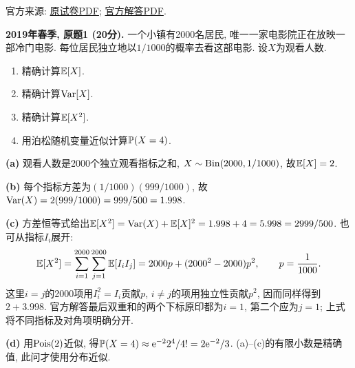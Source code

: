 \noindent 官方来源: \href{https://ocw.mit.edu/courses/18-600-probability-and-random-variables-fall-2019/1ef24cd4a1d900eabbc7e354063beebe_MIT18_600F19_mid1_2019.pdf}{原试卷PDF}; \href{https://ocw.mit.edu/courses/18-600-probability-and-random-variables-fall-2019/043a5f241c41a11ebbae7a84acfa94d2_MIT18_600F19_mid1_2019_soln.pdf}{官方解答PDF}.
\begin{exercise}\label{ex:m1-2019s-q1}
\textbf{2019年春季, 原题1 (20分).} 一个小镇有2000名居民, 唯一一家电影院正在放映一部冷门电影. 每位居民独立地以$1/1000$的概率去看这部电影. 设$X$为观看人数.
\begin{enumerate}\item[(a)]\label{ex:m1-2019s-q1-a} 精确计算$\mathbb E[X]$.\item[(b)]\label{ex:m1-2019s-q1-b} 精确计算$\operatorname{Var}[X]$.\item[(c)]\label{ex:m1-2019s-q1-c} 精确计算$\mathbb E[X^2]$.\item[(d)]\label{ex:m1-2019s-q1-d} 用泊松随机变量近似计算$\mathbb P(X=4)$.\end{enumerate}
\end{exercise}
\begin{solution}
\textbf{(a)}\label{sol:m1-2019s-q1-a} 观看人数是2000个独立观看指标之和, $X\sim\operatorname{Bin}(2000,1/1000)$, 故$\mathbb E[X]=2$.

\textbf{(b)}\label{sol:m1-2019s-q1-b} 每个指标方差为$(1/1000)(999/1000)$, 故$\operatorname{Var}(X)=2(999/1000)=999/500=1.998$.

\textbf{(c)}\label{sol:m1-2019s-q1-c} 方差恒等式给出$\mathbb E[X^2]=\operatorname{Var}(X)+\mathbb E[X]^2=1.998+4=5.998=2999/500$. 也可从指标$I_i$展开:
\[
\mathbb E[X^2]=\sum_{i=1}^{2000}\sum_{j=1}^{2000}\mathbb E[I_iI_j]
=2000p+(2000^2-2000)p^2,\qquad p=\frac1{1000}.
\]
这里$i=j$的2000项用$I_i^2=I_i$贡献$p$, $i\ne j$的项用独立性贡献$p^2$, 因而同样得到$2+3.998$. 官方解答最后双重和的两个下标原印都为$i=1$, 第二个应为$j=1$; 上式将不同指标及对角项明确分开.

\textbf{(d)}\label{sol:m1-2019s-q1-d} 用$\operatorname{Pois}(2)$近似, 得$\mathbb P(X=4)\approx\mathrm e^{-2}2^4/4!=2\mathrm e^{-2}/3$. (a)--(c)的有限小数是精确值, 此问才使用分布近似.
\end{solution}

